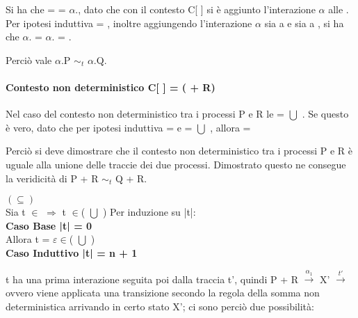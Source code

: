 Si ha che  =  = $\alpha$., dato che con il contesto C[ ] si è aggiunto l'interazione $\alpha$ alle . Per ipotesi induttiva  = , inoltre aggiungendo l'interazione $\alpha$ sia a  e sia a , si ha che $\alpha$. = $\alpha$. = .

Perciò vale $\alpha$.P $\sim_{t}$ $\alpha$.Q.

\paragraph{Contesto non deterministico  C[ ] = (\hspace{0.3cm} + R)} \mbox{}

Nel caso del contesto non deterministico tra i processi P e R le  =  $\bigcup$ . Se questo è vero, dato che per ipotesi induttiva  =  e  =  $\bigcup$ , allora  =  

Perciò si deve dimostrare che il contesto non deterministico tra i processi P e R è uguale alla unione delle traccie dei due processi. Dimostrato questo ne consegue la veridicità di P + R $\sim_{t}$ Q + R.

$(\subseteq)$ \\
Sia t $\in$  $\Rightarrow$  t $\in$( $\bigcup$ )
Per induzione su |t|:
\\

\textbf{Caso Base |t| = 0}
\\
Allora t = $\varepsilon \in$( $\bigcup$ )
\\

\textbf{Caso Induttivo |t| = n + 1}

t ha una prima interazione seguita poi dalla traccia t', quindi P + R $ \overset{\alpha_{1}}\rightarrow $ X' $\overset{t'}\rightarrow$ ovvero viene applicata una transizione secondo la regola della somma non deterministica arrivando in certo stato X'; ci sono perciò due possibilità:

